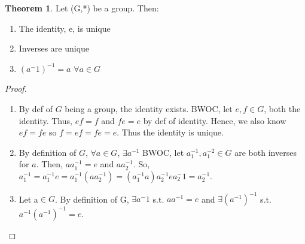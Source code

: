 \documentclass{article}
\theoremstyle{definition}
\newtheorem{theorem}{Theorem}[section]
\begin{document}
\begin{theorem}
Let (G,*) be a group. Then:
	\begin{enumerate}
		\item The identity, e, is unique
		\item Inverses are unique
		\item $(a^-{1})^{-1}= a$ $\forall a \in G$
	\end{enumerate}
\end{theorem}
\begin{proof}
	\begin{enumerate}
		\item By def of $G$ being a group, the identity exists. BWOC, let $e,f \in G$, both the identity. Thus, $ef=f$ and $fe=e$ by def of identity. Hence, we also know $ef=fe$ so $f=ef=fe=e$. Thus the identity is unique.
		\item By definition of $G$, $\forall a \in G$, $\exists a^{-1}$ BWOC, let $a_1^{-1}, a_1^{-2} \in G$ are both inverses for $a$. Then, $aa_1^{-1}=e$ and $aa_2^{-1}$. So, $a_1^{-1}=a_1^{-1}e=a_1^{-1}(aa_2^{-1})=(a_1^{-1}a)a_2^{-1}ea_2^-1=a_2^{-1}$.
		\item Let a$\in G$. By definition of G, $\exists a^-1$ s.t. $aa^{-1}=e$ and $\exists(a^{-1})^{-1}$ s.t. $a^{-1}(a^{-1})^{-1}=e$.
	\end{enumerate}
\end{proof}
\end{document}
